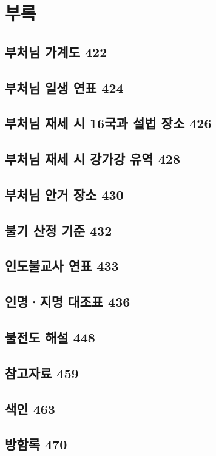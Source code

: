 \documentclass[12pt, a4paper, oneside]{book}
\let\stdsection\section
\renewcommand\section{\newpage\stdsection}
\begin{document}
	\chapter{부록}
	\noptcrule
	\parttoc				


	\section{부처님 가계도 422}


	\section{부처님 일생 연표 424 }

	\section{부처님 재세 시 16국과 설법 장소 426}


	\section{부처님 재세 시 강가강 유역 428 }

	\section{부처님 안거 장소 430 }

	\section{불기 산정 기준 432 }

	\section{인도불교사 연표 433 }

	\section{인명·지명 대조표 436 }

	\section{불전도 해설 448 }

	\section{참고자료 459}

	\section{색인 463 }

	\section{방함록 470}


\end{document}
